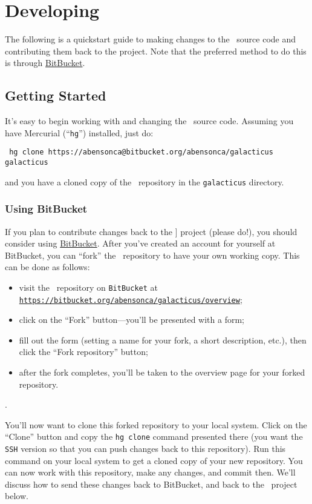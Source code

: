 \chapter{Developing \glc}

The following is a quickstart guide to making changes to the \glc\ source code and contributing them back to the project. Note that the preferred method to do this is through \href{https://bitbucket.org}{\sc BitBucket}.

\section{Getting Started}

It's easy to begin working with and changing the \glc\ source code. Assuming you have Mercurial (``{\tt hg}'') installed, just do:
\begin{verbatim}
 hg clone https://abensonca@bitbucket.org/abensonca/galacticus galacticus
\end{verbatim}
and you have a cloned copy of the \glc\ repository in the {\tt galacticus} directory.

\subsection{Using {\sc BitBucket}}

If you plan to contribute changes back to the \glc] project (please do!), you should consider using \href{https://bitbucket.org}{\sc BitBucket}. After you've created an account for yourself at {\sc BitBucket}, you can ``fork'' the \glc\ repository to have your own working copy. This can be done as follows:
\begin{itemize}
 \item visit the \glc\ repository on {\tt BitBucket} at \href{https://bitbucket.org/abensonca/galacticus/overview}{\tt https://bitbucket.org/abensonca/galacticus/overview};
 \item click on the ``Fork'' button---you'll be presented with a form;
 \item fill out the form (setting a name for your fork, a short description, etc.), then click the ``Fork repository'' button;
 \item after the fork completes, you'll be taken to the overview page for your forked repository.
\end{itemize}. 

You'll now want to clone this forked repository to your local system. Click on the ``Clone'' button and copy the {\tt hg clone} command presented there (you want the {\tt SSH} version so that you can push changes back to this repository). Run this command on your local system to get a cloned copy of your new repository. You can now work with this repository, make any changes, and commit then. We'll discuss how to send these changes back to {\sc BitBucket}, and back to the \glc\ project below.

